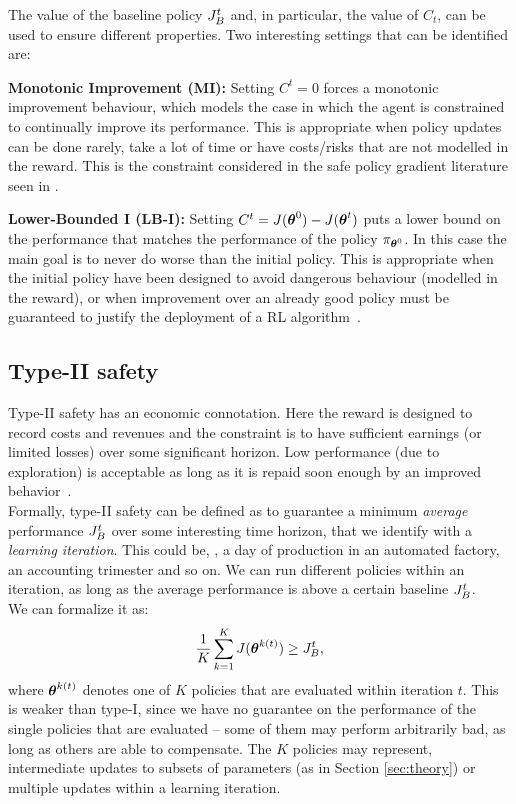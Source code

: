 The value of the baseline policy $\jbase[t]$ and, in particular, the value of $C_t$, can be used to ensure different properties. Two interesting settings that can be identified are:

\textbf{Monotonic Improvement (MI):} Setting $C^t= 0$ forces a monotonic improvement behaviour, which models the case in which the agent is constrained to continually improve its performance. This is appropriate when policy updates can be done rarely, take a lot of time or have costs/risks that are not modelled in the reward. This is the constraint considered in the safe policy gradient literature seen in .

\textbf{Lower-Bounded I (LB-I):}
Setting $C^t = J(\vtheta^0) - J(\vtheta^t)$ puts a lower bound on the performance that matches the performance of the policy $\pi_{\vtheta^0}$. In this case the main goal is to never do worse than the initial policy. This is appropriate when the initial policy have been designed to avoid dangerous behaviour (modelled in the reward), or when improvement over an already good policy must be guaranteed to justify the deployment of a RL algorithm~\cite{pmlr-v37-thomas15}.



\subsection{Type-II safety}

Type-II safety has an economic connotation. Here the reward is designed to record costs and revenues and the constraint is to have sufficient earnings (or limited losses) over some significant horizon. Low performance (\eg due to exploration) is acceptable as long as it is repaid soon enough by an improved behavior~\cite{adaptive_batch}\cite{pmlr-v37-thomas15}.\\
Formally, type-II safety can be defined as to guarantee a minimum \textit{average} performance $\jbase$ over some interesting time horizon, that we identify with a \textit{learning iteration}. This could be, \eg, a day of production in an automated factory, an accounting trimester and so on. We can run different policies within an iteration, as long as the average performance is above a certain baseline $\jbase$.\\
We can formalize it as: 
\begin{align}\label{con:6}
\frac{1}{K}\sum_{k=1}^{K}J(\vtheta^{k(t)}) \geq \jbase,
\end{align}
where $\vtheta^{k(t)}$ denotes one of $K$ policies that are evaluated within iteration $t$. This is weaker than type-I, since we have no guarantee on the performance of the single policies that are evaluated -- some of them may perform arbitrarily bad, as long as others are able to compensate. The $K$ policies may represent, \eg intermediate updates to subsets of parameters (as in Section \ref{sec:theory}) or multiple updates within a learning iteration. 

